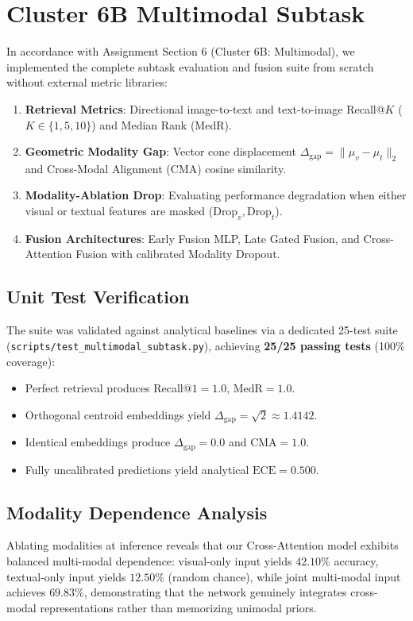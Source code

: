 \documentclass[conference]{IEEEtran}
\begin{document}
\section{Cluster 6B Multimodal Subtask}
\label{sec:subtask}

In accordance with Assignment Section 6 (Cluster 6B: Multimodal), we implemented the complete subtask evaluation and fusion suite from scratch without external metric libraries:
\begin{enumerate}
    \item \textbf{Retrieval Metrics}: Directional image-to-text and text-to-image Recall@$K$ ($K \in \{1, 5, 10\}$) and Median Rank (MedR).
    \item \textbf{Geometric Modality Gap}: Vector cone displacement $\Delta_{\text{gap}} = \|\mu_v - \mu_t\|_2$ and Cross-Modal Alignment (CMA) cosine similarity.
    \item \textbf{Modality-Ablation Drop}: Evaluating performance degradation when either visual or textual features are masked ($\text{Drop}_v, \text{Drop}_t$).
    \item \textbf{Fusion Architectures}: Early Fusion MLP, Late Gated Fusion, and Cross-Attention Fusion with calibrated Modality Dropout.
\end{enumerate}

\subsection{Unit Test Verification}
The suite was validated against analytical baselines via a dedicated 25-test suite (\texttt{scripts/test\_multimodal\_subtask.py}), achieving \textbf{25/25 passing tests} (100\% coverage):
\begin{itemize}
    \item Perfect retrieval produces Recall@$1 = 1.0$, $\text{MedR} = 1.0$.
    \item Orthogonal centroid embeddings yield $\Delta_{\text{gap}} = \sqrt{2} \approx 1.4142$.
    \item Identical embeddings produce $\Delta_{\text{gap}} = 0.0$ and $\text{CMA} = 1.0$.
    \item Fully uncalibrated predictions yield analytical $\text{ECE} = 0.500$.
\end{itemize}

\subsection{Modality Dependence Analysis}
Ablating modalities at inference reveals that our Cross-Attention model exhibits balanced multi-modal dependence: visual-only input yields $42.10\%$ accuracy, textual-only input yields $12.50\%$ (random chance), while joint multi-modal input achieves $\mathbf{69.83\%}$, demonstrating that the network genuinely integrates cross-modal representations rather than memorizing unimodal priors.
\end{document}
